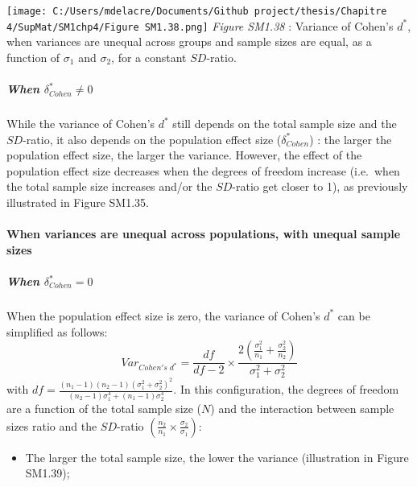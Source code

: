\documentclass[
  english,
  man,mask,floatsintext]{apa6}
\providecommand{\tightlist}{%
  \setlength{\itemsep}{0pt}\setlength{\parskip}{0pt}}
\let\oldparagraph\paragraph
\renewcommand{\paragraph}[1]{\oldparagraph{#1}\mbox{}}
\let\oldsubparagraph\subparagraph
\renewcommand{\subparagraph}[1]{\oldsubparagraph{#1}\mbox{}}
\begin{document}
\texttt{[image: C:/Users/mdelacre/Documents/Github project/thesis/Chapitre 4/SupMat/SM1chp4/Figure SM1.38.png]}
\emph{Figure SM1.38} : Variance of Cohen's \(d^*\), when variances are unequal across groups and sample sizes are equal, as a function of \(\sigma_1\) and \(\sigma_2\), for a constant \(SD\)-ratio.

\hypertarget{when-delta_cohen-neq-0-1}{%
\subparagraph{\texorpdfstring{When \(\delta^*_{Cohen} \neq 0\)}{When \textbackslash delta\^{}*\_\{Cohen\} \textbackslash neq 0}}\label{when-delta_cohen-neq-0-1}}

While the variance of Cohen's \(d^*\) still depends on the total sample size and the \(SD\)-ratio, it also depends on the population effect size (\(\delta^*_{Cohen}\)) : the larger the population effect size, the larger the variance. However, the effect of the population effect size decreases when the degrees of freedom increase (i.e.~when the total sample size increases and/or the \(SD\)-ratio get closer to 1), as previously illustrated in Figure SM1.35.

\newpage

\hypertarget{when-variances-are-unequal-across-populations-with-unequal-sample-sizes-3}{%
\paragraph{When variances are unequal across populations, with unequal sample sizes}\label{when-variances-are-unequal-across-populations-with-unequal-sample-sizes-3}}

\hypertarget{when-delta_cohen-0-2}{%
\subparagraph{\texorpdfstring{When \(\delta^*_{Cohen} = 0\)}{When \textbackslash delta\^{}*\_\{Cohen\} = 0}}\label{when-delta_cohen-0-2}}

When the population effect size is zero, the variance of Cohen's \(d^*\) can be simplified as follows:
\[Var_{Cohen's \; d^*} = \frac{df}{df-2} \times \frac{2\left( \frac{\sigma^2_1}{n_1} + \frac{\sigma^2_2}{n_2} \right)}{\sigma^2_1+\sigma^2_2}\]
with \(df =\frac{(n_1-1)(n_2-1)(\sigma^2_1+\sigma^2_2)^2}{(n_2-1)\sigma_1^4+(n_1-1)\sigma_2^4}\). In this configuration, the degrees of freedom are a function of the total sample size (\(N\)) and the interaction between sample sizes ratio and the \(SD\)-ratio \(\left(\frac{n_2}{n_1}\times\frac{\sigma_2}{\sigma_1} \right)\):

\begin{itemize}
\tightlist
\item
  The larger the total sample size, the lower the variance (illustration in Figure SM1.39);
\end{itemize}
\end{document}
